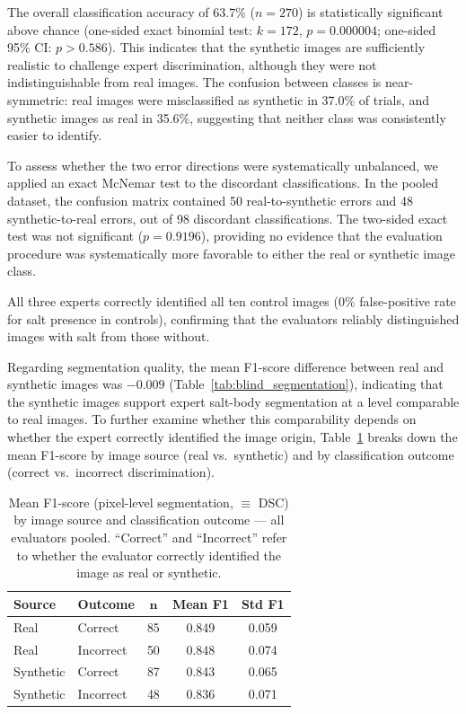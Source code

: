 \documentclass{ieeeaccess}
\begin{document}
The overall classification accuracy of $63.7\%$ ($n = 270$) is statistically significant above chance (one-sided exact binomial test: $k = 172$, $p = 0.000004$; one-sided 95\% CI: $p > 0.586$). This indicates that the synthetic images are sufficiently realistic to challenge expert discrimination, although they were not indistinguishable from real images. The confusion between classes is near-symmetric: real images were misclassified as synthetic in 37.0\% of trials, and synthetic images as real in 35.6\%, suggesting that neither class was consistently easier to identify.

To assess whether the two error directions were systematically unbalanced, we applied an exact McNemar test to the discordant classifications. In the pooled dataset, the confusion matrix contained 50 real-to-synthetic errors and 48 synthetic-to-real errors, out of 98 discordant classifications. The two-sided exact test was not significant ($p = 0.9196$), providing no evidence that the evaluation procedure was systematically more favorable to either the real or synthetic image class. 

All three experts correctly identified all ten control images (0\% false-positive rate for salt presence in controls), confirming that the evaluators reliably distinguished images with salt from those without.

Regarding segmentation quality, the mean F1-score difference between real and synthetic images was $-0.009$ (Table~\ref{tab:blind_segmentation}), indicating that the synthetic images support expert salt-body segmentation at a level comparable to real images. To further examine whether this comparability depends on whether the expert correctly identified the image origin, Table~\ref{tab:blind_seg_breakdown} breaks down the mean F1-score by image source (real vs.\ synthetic) and by classification outcome (correct vs.\ incorrect discrimination).

\begin{table}[htbp]
    \centering
    \caption{Mean F1-score (pixel-level segmentation, $\equiv$ DSC) by image source and classification outcome --- all evaluators pooled. ``Correct'' and ``Incorrect'' refer to whether the evaluator correctly identified the image as real or synthetic.}
    \label{tab:blind_seg_breakdown}
    \footnotesize
    \begin{tabular}{llccc}
        \toprule
        \textbf{Source} & \textbf{Outcome} & $\mathbf{n}$ & \textbf{Mean F1} & \textbf{Std F1} \\
        \midrule
        Real      & Correct   & 85 & 0.849 & 0.059 \\
        Real      & Incorrect & 50 & 0.848 & 0.074 \\
        \midrule
        Synthetic & Correct   & 87 & 0.843 & 0.065 \\
        Synthetic & Incorrect & 48 & 0.836 & 0.071 \\
        \bottomrule
    \end{tabular}
\end{table}
\end{document}
